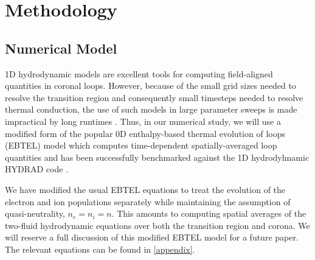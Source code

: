 \documentclass[tighten,apj]{emulateapj}
\begin{document}
	\section{Methodology}
	\label{sec:methods}
	\subsection{Numerical Model}
	\label{subsec:numerics}
	\par 1D hydrodynamic models are excellent tools for computing field-aligned quantities in coronal loops. However, because of the small grid sizes needed to resolve the transition region and consequently small timesteps needed to resolve thermal conduction, the use of such models in large parameter sweeps is made impractical by long runtimes \citep{bradshaw_influence_2013}. Thus, in our numerical study, we will use a modified form of the popular 0D enthalpy-based thermal evolution of loops (EBTEL) model \citep{klimchuk_highly_2008,cargill_enthalpy-based_2012,cargill_enthalpy-based_2012-1,cargill_modelling_2015} which computes time-dependent spatially-averaged loop quantities and has been successfully benchmarked against the 1D hydrodyhnamic HYDRAD code \citep{bradshaw_influence_2013}.
	\par We have modified the usual EBTEL equations \citep[see][]{cargill_enthalpy-based_2012} to treat the evolution of the electron and ion populations separately while maintaining the assumption of quasi-neutrality, $n_e=n_i=n$. This amounts to computing spatial averages of the two-fluid hydrodynamic equations over both the transition region and corona. We will reserve a full discussion of this modified EBTEL model for a future paper. The relevant equations can be found in \autoref{appendix}.  
\end{document}
